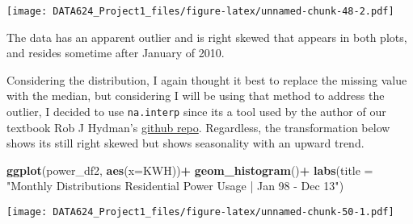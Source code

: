 \documentclass[
]{article}
\newenvironment{Shaded}{\begin{snugshade}}{\end{snugshade}}
\newcommand{\AttributeTok}[1]{\textcolor[rgb]{0.13,0.29,0.53}{#1}}
\newcommand{\CommentTok}[1]{\textcolor[rgb]{0.56,0.35,0.01}{\textit{#1}}}
\newcommand{\FunctionTok}[1]{\textcolor[rgb]{0.13,0.29,0.53}{\textbf{#1}}}
\newcommand{\NormalTok}[1]{#1}
\newcommand{\OtherTok}[1]{\textcolor[rgb]{0.56,0.35,0.01}{#1}}
\newcommand{\SpecialCharTok}[1]{\textcolor[rgb]{0.81,0.36,0.00}{\textbf{#1}}}
\newcommand{\StringTok}[1]{\textcolor[rgb]{0.31,0.60,0.02}{#1}}
\begin{document}
\texttt{[image: DATA624\_Project1\_files/figure-latex/unnamed-chunk-48-2.pdf]}

The data has an apparent outlier and is right skewed that appears in
both plots, and resides sometime after January of 2010.

\begin{Shaded}
\end{Shaded}

Considering the distribution, I again thought it best to replace the
missing value with the median, but considering I will be using that
method to address the outlier, I decided to use \texttt{na.interp} since
its a tool used by the author of our textbook Rob J Hydman's
\href{https://github.com/robjhyndman/forecast/blob/master/man/na.interp.Rd}{github
repo}. Regardless, the transformation below shows its still right skewed
but shows seasonality with an upward trend.

\begin{Shaded}
\begin{Highlighting}[]
\FunctionTok{ggplot}\NormalTok{(power\_df2, }\FunctionTok{aes}\NormalTok{(}\AttributeTok{x=}\NormalTok{KWH))}\SpecialCharTok{+}
  \FunctionTok{geom\_histogram}\NormalTok{()}\SpecialCharTok{+}
  \FunctionTok{labs}\NormalTok{(}\AttributeTok{title =} \StringTok{"Monthly Distributions Residential Power Usage | Jan \textquotesingle{}98 {-} Dec \textquotesingle{}13"}\NormalTok{)}
\end{Highlighting}
\end{Shaded}

\texttt{[image: DATA624\_Project1\_files/figure-latex/unnamed-chunk-50-1.pdf]}

\begin{Shaded}
\end{Shaded}
\end{document}

